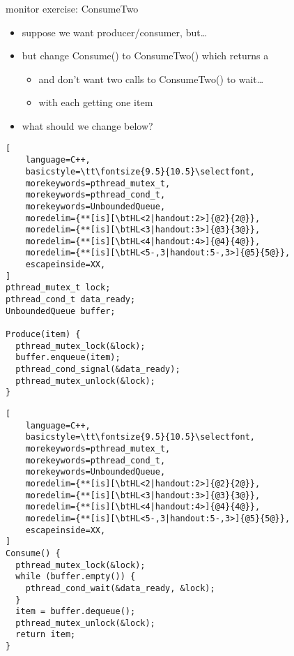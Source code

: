 \begin{frame}[fragile,label=monitorExercise]{monitor exercise: ConsumeTwo}
\begin{itemize}
\item suppose we want producer/consumer, but\ldots
\item but change Consume() to ConsumeTwo() which returns a 
    \begin{itemize}
    \item and don't want two calls to ConsumeTwo() to wait\ldots
    \item with each getting one item
    \end{itemize}
\item what should we change below?
\end{itemize}
\begin{minipage}{0.45\textwidth}
\begin{lstlisting}[
    language=C++,
    basicstyle=\tt\fontsize{9.5}{10.5}\selectfont,
    morekeywords=pthread_mutex_t,
    morekeywords=pthread_cond_t,
    morekeywords=UnboundedQueue,
    moredelim={**[is][\btHL<2|handout:2>]{@2}{2@}}, 
    moredelim={**[is][\btHL<3|handout:3>]{@3}{3@}}, 
    moredelim={**[is][\btHL<4|handout:4>]{@4}{4@}}, 
    moredelim={**[is][\btHL<5-,3|handout:5-,3>]{@5}{5@}}, 
    escapeinside=XX,
]
pthread_mutex_t lock;
pthread_cond_t data_ready;
UnboundedQueue buffer;

Produce(item) {
  pthread_mutex_lock(&lock);
  buffer.enqueue(item);
  pthread_cond_signal(&data_ready);
  pthread_mutex_unlock(&lock);
}
\end{lstlisting}
\end{minipage}
\begin{minipage}{0.45\textwidth}
\begin{lstlisting}[
    language=C++,
    basicstyle=\tt\fontsize{9.5}{10.5}\selectfont,
    morekeywords=pthread_mutex_t,
    morekeywords=pthread_cond_t,
    morekeywords=UnboundedQueue,
    moredelim={**[is][\btHL<2|handout:2>]{@2}{2@}}, 
    moredelim={**[is][\btHL<3|handout:3>]{@3}{3@}}, 
    moredelim={**[is][\btHL<4|handout:4>]{@4}{4@}}, 
    moredelim={**[is][\btHL<5-,3|handout:5-,3>]{@5}{5@}}, 
    escapeinside=XX,
]
Consume() {
  pthread_mutex_lock(&lock);
  while (buffer.empty()) {
    pthread_cond_wait(&data_ready, &lock);
  }
  item = buffer.dequeue();
  pthread_mutex_unlock(&lock);
  return item;
}
\end{lstlisting}
\end{minipage}
\end{frame}

